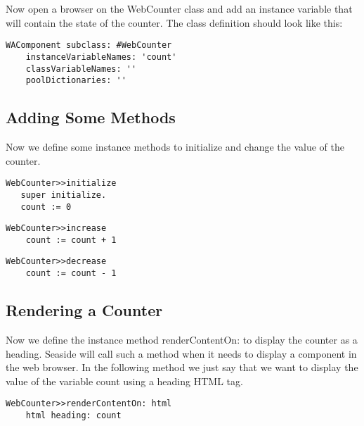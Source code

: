 \documentclass[a4paper,10pt,twoside]{book}
\newcommand{\ct}[1]{{\small\ttfamily\textup{#1}}}
\begin{document}
Now open a browser on the \ct{WebCounter} class and add an instance variable that will contain the state of the counter.  The class definition should look like this:

\begin{lstlisting}
WAComponent subclass: #WebCounter
    instanceVariableNames: 'count'
    classVariableNames: ''
    poolDictionaries: ''
\end{lstlisting}

\subsection{Adding Some Methods}
\label{book:gettingstarted:vasmalltalk:firstcomponent:addingmethods}

Now we define some instance methods to initialize and change the value of the counter.

\begin{lstlisting}
WebCounter>>initialize
   super initialize.
   count := 0
\end{lstlisting}

\begin{lstlisting}
WebCounter>>increase
    count := count + 1
\end{lstlisting}

\begin{lstlisting}
WebCounter>>decrease
    count := count - 1
\end{lstlisting}

\subsection{Rendering a Counter}
\label{book:gettingstarted:vasmalltalk:firstcomponent:renderingcounter}

Now we define the instance method \ct{renderContentOn:} to display the counter as a heading. Seaside will call such a method when it needs to display a component in the web browser. In the following method we just say that we want to display the value of the variable \ct{count} using a heading HTML tag.

\begin{lstlisting}
WebCounter>>renderContentOn: html
    html heading: count
\end{lstlisting}
\end{document}
